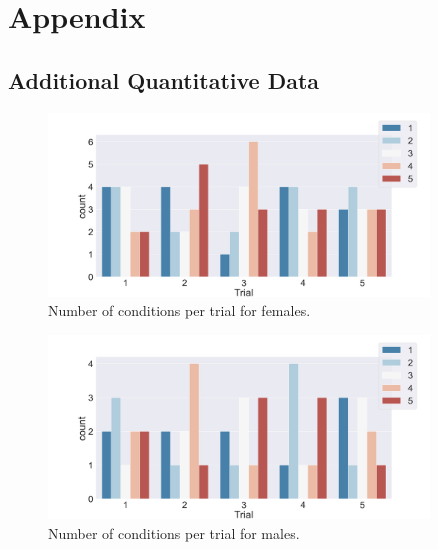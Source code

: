 \section{Appendix}


\subsection{Additional Quantitative Data}
\label{subsection:additionalData}

\begin{figure}[H]

\centering
\captionsetup{justification=centering,margin=0.1cm}
\includegraphics[width=0.9\textwidth]{Files/Plots/condition_by_trial_females.png}
 \caption{Number of conditions per trial for females.}
 \label{fig:condPerTrialF}
\end{figure}

\begin{figure}[H]

\centering
\captionsetup{justification=centering,margin=0.1cm}
\includegraphics[width=0.9\textwidth]{Files/Plots/condition_by_trial_males.png}
\caption{Number of conditions per trial for males.}
\label{fig:condPerTrialM}
\end{figure}


